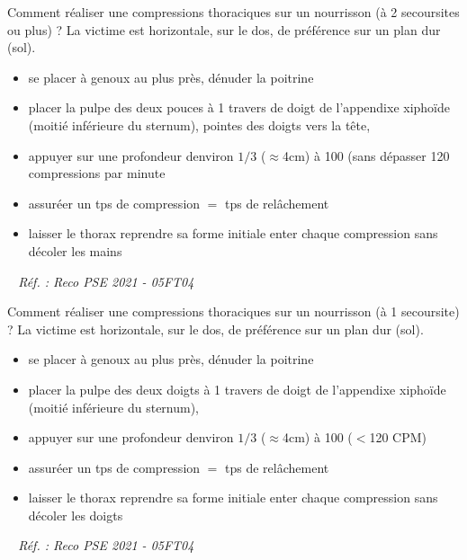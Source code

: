 \documentclass[grid,avery5371,landscape]{flashcards}
\makeatletter
\newcounter{nocarte}
\newcommand{\categ}[1]{%
  \def\@categ{#1}%
  \setcounter{nocarte}{0}%
}
\newcommand{\source}[1]{%
  \medskip
  \itshape%
   ~ \hfill Réf. : #1}
\makeatother
\begin{document}
\color[HTML]{003273}
\categ{PSE}
\begin{flashcard}[geste]{
 Comment réaliser une compressions thoraciques sur un nourrisson (à 2 secoursites ou plus) ?   }
  La victime est horizontale, sur le dos, de préférence sur un plan dur (sol). \\
\begin{itemize}
\item se placer à genoux au plus près, dénuder la poitrine 
\item placer la pulpe des deux pouces à 1 travers de doigt de l'appendixe xiphoïde (moitié inférieure du sternum), pointes des doigts vers la tête,
\item appuyer sur une profondeur denviron $1/3$ ($\approx$4cm) à 100 (sans dépasser 120 compressions par minute 
\item assuréer un tps de compression $=$ tps de relâchement
\item laisser le thorax reprendre sa forme initiale enter chaque compression sans décoler les mains
\end{itemize}
  \source{Reco PSE 2021 - 05FT04}
\end{flashcard}


\color[HTML]{003273}
\categ{PSE}
\begin{flashcard}[geste]{
 Comment réaliser une compressions thoraciques sur un nourrisson (à 1 secoursite) ?   }
  La victime est horizontale, sur le dos, de préférence sur un plan dur (sol). \\
\begin{itemize}
\item se placer à genoux au plus près, dénuder la poitrine 
\item placer la pulpe des deux doigts à 1 travers de doigt de l'appendixe xiphoïde (moitié inférieure du sternum), 
\item appuyer sur une profondeur denviron $1/3$ ($\approx$4cm) à 100 ($<$120 CPM) 
\item assuréer un tps de compression $=$ tps de relâchement
\item laisser le thorax reprendre sa forme initiale enter chaque compression sans décoler les doigts
\end{itemize}
 
  \source{Reco PSE 2021 - 05FT04}
\end{flashcard}
\end{document}
